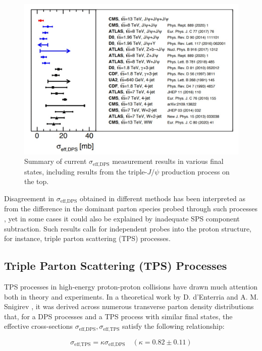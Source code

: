 \documentclass[10pt,twocolumn]{article}
\newcommand*{\effXsecDPS}{\sigma_{\text{eff,DPS}}}
\newcommand*{\effXsecTPS}{\sigma_{\text{eff,TPS}}}
\begin{document}
\begin{figure}[!htbp]
    \centering
    \includegraphics[width=1.0\linewidth]{images/sigma_eff_DPS_summary.png}
    \caption{Summary of current \texorpdfstring{$\effXsecDPS$}{DPS effective cross-section} measurement results in various final states, including results from the triple-$J/\psi$ production process on the top.\cite{CMS_TRI_JPSI}}
    \label{fig:sigma-eff-dps-summary}
\end{figure}

Disagreement in $\effXsecDPS$ obtained in different methods has been interpreted as from the difference in the dominant parton species probed through such processes \cite{MPI_LHC}, yet in some cases it could also be explained by inadequate SPS component subtraction. Such results calls for independent probes into the proton structure, for instance, triple parton scattering (TPS) processes.

\subsection{Triple Parton Scattering (TPS) Processes}

TPS processes in high-energy proton-proton collisions have drawn much attention both in theory and experiments. In a theoretical work by D. d'Enterria and A. M. Snigirev \cite{DdE_TPS}, it was derived across numerous transverse parton density distributions that, for a DPS processes and a TPS process with similar final states, the effective cross-sections $\effXsecDPS, \effXsecTPS$ satisfy the following relationship:

\begin{equation}
    \label{eqn:dps_tps_eff_xsec}
    \effXsecTPS = \kappa \effXsecDPS \quad (\kappa = 0.82 \pm  0.11)
\end{equation}
\end{document}

